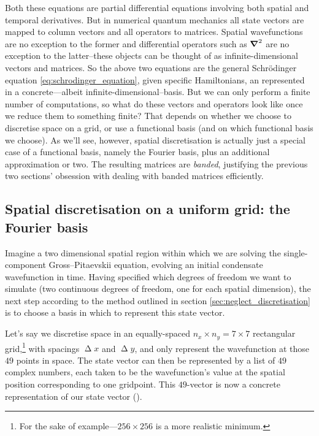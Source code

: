 Both these equations are partial differential equations involving both spatial and temporal derivatives. But in numerical quantum mechanics all state vectors are mapped to column vectors and all operators to matrices. Spatial wavefunctions are no exception to the former and differential operators such as $\grad^2$ are no exception to the latter--these objects can be thought of as infinite-dimensional vectors and matrices. So the above two equations are the general Schr\"odinger equation \eqref{eq:schrodinger_equation}, given specific Hamiltonians, an represented in a concrete---albeit infinite-dimensional--basis. But we can only perform a finite number of computations, so what do these vectors and operators look like once we reduce them to something finite? That depends on whether we choose to discretise space on a grid, or use a functional basis (and on which functional basis we choose). As we'll see, however, spatial discretisation is actually just a special case of a functional basis, namely the Fourier basis, plus an additional approximation or two. The resulting matrices are \emph{banded}, justifying the previous two sections' obsession with dealing with banded matrices efficiently.

\subsection{Spatial discretisation on a uniform grid: the Fourier basis}

Imagine a two dimensional spatial region within which we are solving the single-component Gross--Pitaevskii equation, evolving an initial condensate wavefunction in time. Having specified which degrees of freedom we want to simulate (two continuous degrees of freedom, one for each spatial dimension), the next step according to the method outlined in section \ref{sec:neglect_discretisation} is to choose a basis in which to represent this state vector.

Let's say we discretise space in an equally-spaced $n_x\times n_y = 7\times 7$ rectangular grid,\footnote{For the sake of example---$256\times256$ is a more realistic minimum.} with spacings $\upDelta x$ and $\upDelta y$, and only represent the wavefunction at those $49$ points in space. The state vector can then be represented by a list of $49$ complex numbers, each taken to be the wavefunction's value at the spatial position corresponding to one gridpoint. This $49$-vector is now a concrete representation of our state vector ().

